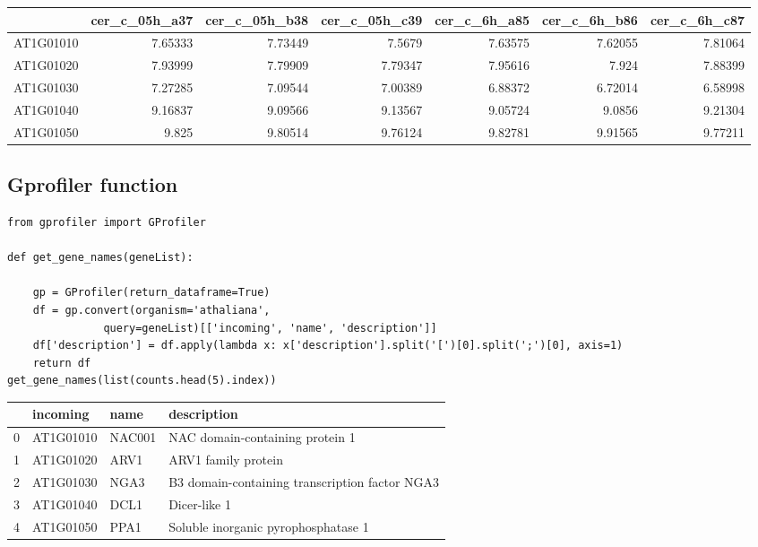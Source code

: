 \documentclass[a4paper]{article}
\begin{document}
\begin{center}
\begin{tabular}{lrrrrrr}
 & cer\_c\_05h\_a37 & cer\_c\_05h\_b38 & cer\_c\_05h\_c39 & cer\_c\_6h\_a85 & cer\_c\_6h\_b86 & cer\_c\_6h\_c87\\
\hline
AT1G01010 & 7.65333 & 7.73449 & 7.5679 & 7.63575 & 7.62055 & 7.81064\\
AT1G01020 & 7.93999 & 7.79909 & 7.79347 & 7.95616 & 7.924 & 7.88399\\
AT1G01030 & 7.27285 & 7.09544 & 7.00389 & 6.88372 & 6.72014 & 6.58998\\
AT1G01040 & 9.16837 & 9.09566 & 9.13567 & 9.05724 & 9.0856 & 9.21304\\
AT1G01050 & 9.825 & 9.80514 & 9.76124 & 9.82781 & 9.91565 & 9.77211\\
\end{tabular}
\end{center}

\subsection{Gprofiler function}
\label{sec:org83696fe}
\begin{verbatim}
from gprofiler import GProfiler

def get_gene_names(geneList):

    gp = GProfiler(return_dataframe=True)
    df = gp.convert(organism='athaliana',
               query=geneList)[['incoming', 'name', 'description']]
    df['description'] = df.apply(lambda x: x['description'].split('[')[0].split(';')[0], axis=1)
    return df
get_gene_names(list(counts.head(5).index))
\end{verbatim}

\begin{center}
\begin{tabular}{rlll}
 & incoming & name & description\\
\hline
0 & AT1G01010 & NAC001 & NAC domain-containing protein 1\\
1 & AT1G01020 & ARV1 & ARV1 family protein\\
2 & AT1G01030 & NGA3 & B3 domain-containing transcription factor NGA3\\
3 & AT1G01040 & DCL1 & Dicer-like 1\\
4 & AT1G01050 & PPA1 & Soluble inorganic pyrophosphatase 1\\
\end{tabular}
\end{center}
\end{document}
